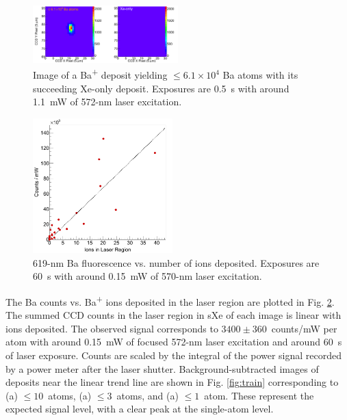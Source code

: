 \documentclass[aps,pra,reprint,superscriptaddress]{revtex4-1}
\begin{document}
\begin{figure}
\includegraphics[width=0.5\textwidth]{figures/xebaxe_largest_instantaneous.png}
\caption{Image of a Ba\textsuperscript{+} deposit yielding $\leq 6.1 \times 10^4$ Ba atoms with its succeeding Xe-only deposit.  Exposures are 0.5~s with around 1.1~mW of 572-nm laser excitation.}
\label{fig:XeBaXeLarge}
\end{figure}

\begin{figure}
\includegraphics[width=0.48\textwidth]{figures/lin_just20150807_lin.png}
\caption{619-nm Ba fluorescence vs. number of ions deposited.  Exposures are 60~s with around 0.15~mW of 570-nm laser excitation.}
\label{fig:ctsVsIons}
\end{figure}

The Ba counts vs. Ba\textsuperscript{+} ions deposited in the laser region are plotted in Fig. \ref{fig:ctsVsIons}.  The summed CCD counts in the laser region in sXe of each image is linear with ions deposited.  The observed signal corresponds to $3400 \pm 360$~counts/mW per atom with around 0.15~mW of focused 572-nm laser excitation and around 60~s of laser exposure.  Counts are scaled by the integral of the power signal recorded by a power meter after the laser shutter.  Background-subtracted images of deposits near the linear trend line are shown in Fig. \ref{fig:train} corresponding to (a) $\leq 10$~atoms, (a) $\leq 3$~atoms, and (a) $\leq 1$~atom.  These represent the expected signal level, with a clear peak at the single-atom level.
\end{document}
